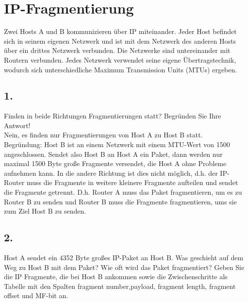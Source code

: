 \documentclass[paper=a4, fontsize=11pt]{scrartcl}
\numberwithin{equation}{section}
\numberwithin{figure}{section}
\numberwithin{table}{section}
\begin{document}
\section{IP-Fragmentierung}
Zwei Hosts A und B kommunizieren über IP miteinander. Jeder Host befindet sich in seinem eigenen Netzwerk und ist mit dem Netzwerk des anderen Hosts über ein drittes Netzwerk verbunden. Die Netzwerke sind untereinander mit Routern verbunden. Jedes Netzwerk verwendet seine eigene Übertragstechnik, wodurch sich unterschiedliche Maximum Transmission Units (MTUs) ergeben.

\subsection{1.}
Finden in beide Richtungen Fragmentierungen statt? Begründen Sie Ihre Antwort! \\

Nein, es finden nur Fragmentierungen von Host A zu Host B statt. \\

Begründung:
Host B ist an einem Netzwerk mit einem MTU-Wert von 1500 angeschlossen. Sendet also Host B an Host A ein Paket, dann werden nur maximal 1500 Byte große Fragmente versendet, die Host A ohne Probleme aufnehmen kann. In die andere Richtung ist dies nicht möglich, d.h. der IP-Router muss die Fragmente in weitere kleinere Fragmente aufteilen und sendet die Fragmente getrennt. D.h. Router A muss das Paket fragmentieren, um es zu Router B zu senden und Router B muss die Fragmente fragmentieren, ums sie zum Ziel Host B zu senden.

\subsection{2.}
Host A sendet ein 4352 Byte großes IP-Paket an Host B. Was geschieht auf dem Weg zu Host B mit dem Paket? Wie oft wird das Paket fragmentiert? Geben Sie die IP Fragmente, die bei Host B ankommen sowie die Zwischenschritte als Tabelle mit den Spalten fragment number,payload, fragment length, fragment offset und MF-bit an. \\
\end{document}
